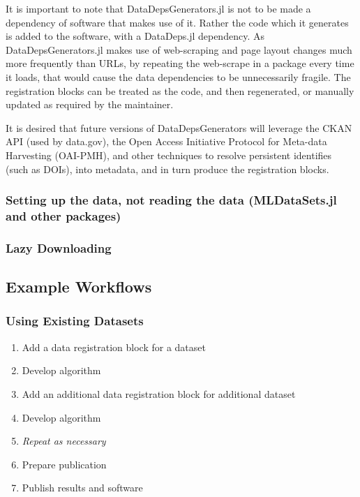 \documentclass{jors}
\begin{document}
It is important to note that DataDepsGenerators.jl is not to be made a dependency of software that makes use of it.
Rather the code which it generates is added to the software, with a DataDeps.jl dependency.
As DataDepsGenerators.jl makes use of web-scraping and page layout changes much more frequently than URLs,
by repeating the web-scrape in a package every time it loads, that would cause the data dependencies to be unnecessarily fragile.
The registration blocks can be treated as the code, and then regenerated, or manually updated as required by the maintainer.





It is desired that future versions of DataDepsGenerators will leverage the CKAN API (used by data.gov), the Open Access Initiative Protocol for Meta-data Harvesting (OAI-PMH), and other techniques to resolve persistent identifies (such as DOIs), into metadata, and in turn produce the registration blocks.


\subsubsection{Setting up the data, not reading the data (MLDataSets.jl and other packages)}

\subsubsection{Lazy Downloading}


\subsection{Example Workflows}

\subsubsection{Using Existing Datasets}
\begin{enumerate}
	\item Add a data registration block for a dataset
	\item Develop algorithm
	\item Add an additional data registration block for additional dataset 
	\item Develop algorithm
	\item \emph{Repeat as necessary}
	\item Prepare publication
	\item Publish results and software
\end{enumerate}
\end{document}
